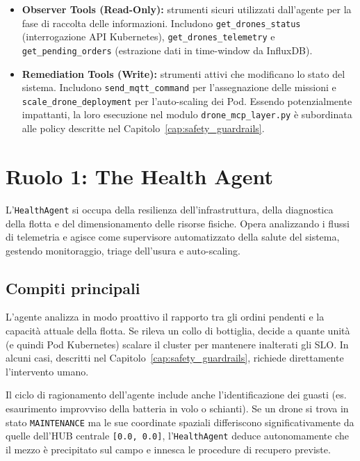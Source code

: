 \begin{itemize}
    \item \textbf{Observer Tools (Read-Only):} strumenti sicuri utilizzati dall'agente per la fase di raccolta delle informazioni. Includono \texttt{get\_drones\_status} (interrogazione API Kubernetes), \texttt{get\_drones\_telemetry} e \texttt{get\_pending\_orders} (estrazione dati in time-window da InfluxDB).
    \item \textbf{Remediation Tools (Write):} strumenti attivi che modificano lo stato del sistema. Includono \texttt{send\_mqtt\_command} per l'assegnazione delle missioni e \texttt{scale\_drone\_deployment} per l'auto-scaling dei Pod. Essendo potenzialmente impattanti, la loro esecuzione nel modulo \texttt{drone\_mcp\_layer.py} è subordinata alle policy descritte nel Capitolo~\ref{cap:safety_guardrails}.
\end{itemize}

\section{Ruolo 1: The Health Agent}
\label{sec:health_agent}

L'\texttt{HealthAgent} si occupa della resilienza dell'infrastruttura, della diagnostica della flotta e del dimensionamento delle risorse fisiche. Opera analizzando i flussi di telemetria e agisce come supervisore automatizzato della salute del sistema, gestendo monitoraggio, triage dell'usura e auto-scaling.

\subsection*{Compiti principali}

L'agente analizza in modo proattivo il rapporto tra gli ordini pendenti e la capacità attuale della flotta. Se rileva un collo di bottiglia, decide a quante unità (e quindi Pod Kubernetes) scalare il cluster per mantenere inalterati gli SLO. In alcuni casi, descritti nel Capitolo~\ref{cap:safety_guardrails}, richiede direttamente l'intervento umano.

Il ciclo di ragionamento dell'agente include anche l'identificazione dei guasti (es. esaurimento improvviso della batteria in volo o schianti). Se un drone si trova in stato \texttt{MAINTENANCE} ma le sue coordinate spaziali differiscono significativamente da quelle dell'HUB centrale \texttt{[0.0, 0.0]}, l'\texttt{HealthAgent} deduce autonomamente che il mezzo è precipitato sul campo e innesca le procedure di recupero previste.

